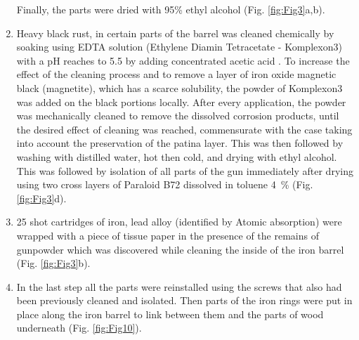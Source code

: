 \begin{enumerate}
	Finally, the parts were dried with 95\% ethyl alcohol (Fig. \ref{fig:Fig3}a,b).
	\item Heavy black rust, in certain parts of the barrel was cleaned chemically by soaking using EDTA solution (Ethylene Diamin Tetracetate - Komplexon{\small3}) with a pH reaches to \num{5.5} by adding concentrated acetic acid \parencite[225]{Sobhy_2006}. To increase the effect of the cleaning process and to remove a layer of iron oxide magnetic black (magnetite), which has a scarce solubility, the powder of Komplexon3 was added on the black portions locally. After every application, the powder was mechanically cleaned to remove the dissolved corrosion products, until the desired effect of cleaning was reached, commensurate with the case taking into account the preservation of the patina layer. This was then followed by washing with distilled water, hot then cold, and drying with ethyl alcohol. 
This was followed by isolation of all parts of the gun immediately after drying using two cross layers of Paraloid B72 dissolved in toluene \SI{4}{\percent} (Fig. \ref{fig:Fig3}d).
	\item 25 shot cartridges of iron, lead alloy (identified by Atomic absorption) were wrapped with a piece of tissue paper in the presence of the remains of gunpowder which was discovered while cleaning the inside of the iron barrel (Fig. \ref{fig:Fig3}b).
	\item In the last step all the parts were reinstalled using the screws that also had been previously cleaned and isolated. Then parts of the iron rings were put in place along the iron barrel to link between them and the parts of wood underneath (Fig. \ref{fig:Fig10}).
\end{enumerate}

